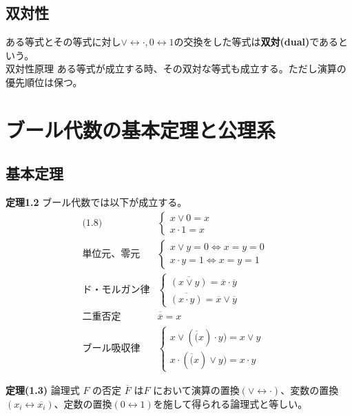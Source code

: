 \documentclass[a4j,10pt,oneside,openany,fleqn]{jsbook}
\begin{document}
\subsection{双対性}

ある等式とその等式に対し$\vee \leftrightarrow \cdot, 0 \leftrightarrow 1$の交換をした等式は\textbf{双対(dual)}であるという。\\
双対性原理
ある等式が成立する時、その双対な等式も成立する。ただし演算の優先順位は保つ。

\section{ブール代数の基本定理と公理系}
\subsection{基本定理}
\textbf{定理1.2} ブール代数では以下が成立する。
\begin{align*}
  \textrm{(1.8)}&
  \begin{cases}
    x \vee 0 = x \\
    x \cdot 1 = x
  \end{cases}&\\
  \textrm{単位元、零元}&
  \begin{cases}
    x \vee y = 0 \Leftrightarrow x=y=0 \\
    x \cdot y = 1 \Leftrightarrow x=y=1
  \end{cases}&\\
  ド・モルガン律&
  \begin{cases}
    \overline{(x \vee y)} = \overline{x} \cdot \overline{y} \\
    \overline{(x \cdot y)} = \overline{x} \vee \overline{y}     
  \end{cases}&\\
  二重否定  &
  \overline{\overline{x}} = x&\\
  ブール吸収律&
  \begin{cases}
    x \vee (\overline(x) \cdot y) = x \vee y \\
    x \cdot(\overline(x) \vee y) = x \cdot y
  \end{cases}&  
\end{align*}

\textbf{定理(1.3)} 論理式 $F$ の否定 $\overline{F}$ は$F$ において演算の置換$(\vee \leftrightarrow \cdot)$、変数の置換 $(x_i \leftrightarrow \overline{x_i})$、定数の置換$(0\leftrightarrow 1)$を施して得られる論理式と等しい。\\
\end{document}
